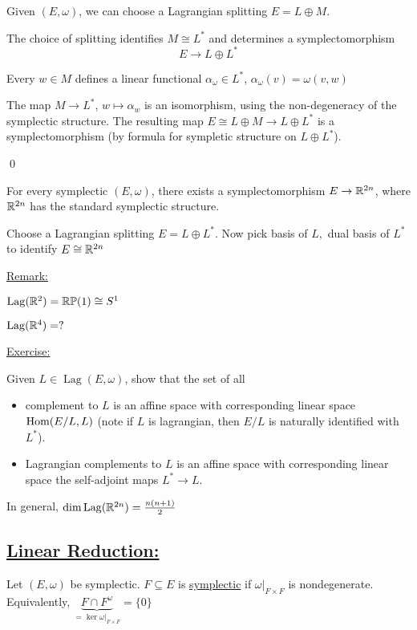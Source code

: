 \documentclass[x11names,reqno,14pt]{extarticle}
\DeclareMathOperator{\Lag}{Lag}
\begin{document}
Given $(E, \omega)$, we can choose a Lagrangian splitting $E = L \oplus M$. 

\prop The choice of splitting identifies $M\cong L^*$ and determines a symplectomorphism 
\[
E\to L\oplus L^*
\]

\proof

Every $w \in M$ defines a linear functional $\alpha_\omega \in L^*$, $\alpha_\omega(v) = \omega(v, w)$

The map $M \to L^*$, $w \mapsto \alpha_w$ is an isomorphism, using the non-degeneracy of the symplectic structure. The resulting map $E \cong L \oplus M \to L \oplus L^*$ is a symplectomorphism (by formula for sympletic structure on $L \oplus L^*$).

\qed

\prop

For every symplectic $(E, \omega)$, there exists a symplectomorphism $E \to \mathbb{R}^{2n}$, where $\mathbb{R}^{2n}$ has the standard symplectic structure. 

\proof

Choose a Lagrangian splitting $E = L \oplus L^*$. Now pick basis of $L, $ dual basis of $L^*$ to identify $E \cong \mathbb{R}^{2n}$

\underline{Remark:}

$\Lag(\R^2) = \RP(1) \cong S^1$

$\Lag(\R^4) = ?$

\underline{Exercise:}

Given $L \in \Lag(E,\omega)$, show that the set of all 
\begin{itemize}

\item complement to $L$ is an affine space with corresponding linear space ${\mathrm{Hom}}(E/L,L)$ (note if $L$ is lagrangian, then $E/L$ is naturally identified with $L^*$).

\item Lagrangian complements to $L$ is an affine space with corresponding linear space the self-adjoint maps $L^* \to L$.

\end{itemize}

In general, $\dim \Lag(\R^{2n}) = \frac{n(n + 1)}{2}$

\subsection*{\underline{Linear Reduction:}}

Let $(E, \omega)$ be symplectic. $F \subseteq E$ is \underline{symplectic} if $\omega|_{F\times F}$ is nondegenerate. Equivalently, $\underbrace{F\cap F^\omega}_{=\ker \omega|_{F\times F}} = \{0\}$
\end{document}
